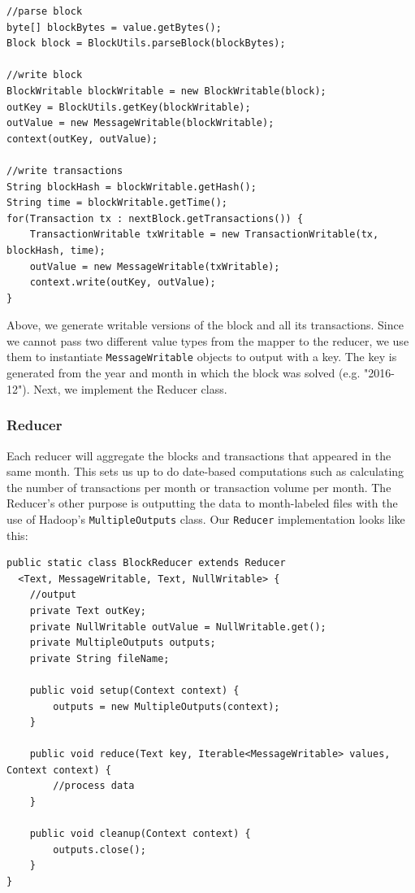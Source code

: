 \documentclass[9pt,twocolumn,twoside]{idsi}
\begin{document}
\begin{lstlisting}
//parse block
byte[] blockBytes = value.getBytes();
Block block = BlockUtils.parseBlock(blockBytes);

//write block
BlockWritable blockWritable = new BlockWritable(block);
outKey = BlockUtils.getKey(blockWritable);
outValue = new MessageWritable(blockWritable);
context(outKey, outValue);

//write transactions
String blockHash = blockWritable.getHash();
String time = blockWritable.getTime();
for(Transaction tx : nextBlock.getTransactions()) {
    TransactionWritable txWritable = new TransactionWritable(tx, blockHash, time);
    outValue = new MessageWritable(txWritable);
    context.write(outKey, outValue);
}
\end{lstlisting}

Above, we generate writable versions of the block and all its transactions. Since we cannot pass two different value types from the mapper to the reducer, we use them to instantiate \lstinline{MessageWritable} objects to output with a key. The key is generated from the year and month in which the block was solved (e.g. "2016-12"). Next, we implement the Reducer class.

\subsubsection{Reducer}
Each reducer will aggregate the blocks and transactions that appeared in the same month. This sets us up to do date-based computations such as calculating the number of transactions per month or transaction volume per month. The Reducer's other purpose is outputting the data to  month-labeled files with the use of Hadoop's \lstinline{MultipleOutputs} class. Our \lstinline{Reducer} implementation looks like this:

\begin{lstlisting}
public static class BlockReducer extends Reducer
  <Text, MessageWritable, Text, NullWritable> {
    //output
    private Text outKey;
    private NullWritable outValue = NullWritable.get();
    private MultipleOutputs outputs;
    private String fileName;

    public void setup(Context context) {
        outputs = new MultipleOutputs(context);
    }

    public void reduce(Text key, Iterable<MessageWritable> values, Context context) {
        //process data
    }

    public void cleanup(Context context) {
        outputs.close();
    }
}
\end{lstlisting}
\end{document}
